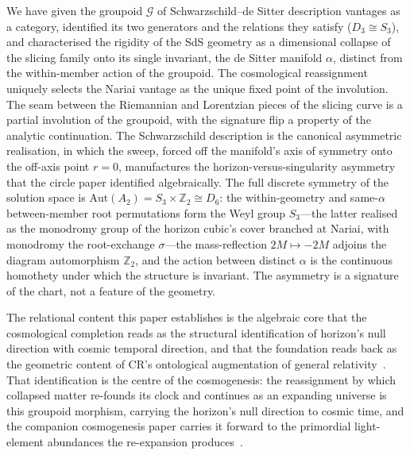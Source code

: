 \documentclass[11pt,a4paper]{article}
\theoremstyle{definition}
\begin{document}
We have given the groupoid $\mathcal{G}$ of Schwarzschild--de Sitter description vantages as a category, identified its two generators and the relations they satisfy ($D_{3}\cong S_{3}$), and characterised the rigidity of the SdS geometry as a dimensional collapse of the slicing family onto its single invariant, the de Sitter manifold $\alpha$, distinct from the within-member action of the groupoid. The cosmological reassignment uniquely selects the Nariai vantage as the unique fixed point of the involution. The seam between the Riemannian and Lorentzian pieces of the slicing curve is a partial involution of the groupoid, with the signature flip a property of the analytic continuation. The Schwarzschild description is the canonical asymmetric realisation, in which the sweep, forced off the manifold's axis of symmetry onto the off-axis point $r=0$, manufactures the horizon-versus-singularity asymmetry that the circle paper identified algebraically. The full discrete symmetry of the solution space is $\mathrm{Aut}(A_{2})=S_{3}\times\mathbb{Z}_{2}\cong D_{6}$: the within-geometry and same-$\alpha$ between-member root permutations form the Weyl group $S_{3}$---the latter realised as the monodromy group of the horizon cubic's cover branched at Nariai, with monodromy the root-exchange $\sigma$---the mass-reflection $2M\mapsto-2M$ adjoins the diagram automorphism $\mathbb{Z}_{2}$, and the action between distinct $\alpha$ is the continuous homothety under which the structure is invariant. The asymmetry is a signature of the chart, not a feature of the geometry.

The relational content this paper establishes is the algebraic core that the cosmological completion reads as the structural identification of horizon's null direction with cosmic temporal direction, and that the foundation reads back as the geometric content of CR's ontological augmentation of general relativity~\cite{JanzenModernParallax}. That identification is the centre of the cosmogenesis: the reassignment by which collapsed matter re-founds its clock and continues as an expanding universe is this groupoid morphism, carrying the horizon's null direction to cosmic time, and the companion cosmogenesis paper carries it forward to the primordial light-element abundances the re-expansion produces~\cite{JanzenCosmogenesis}.
\end{document}
